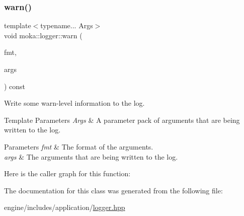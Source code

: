 \subsubsection{\texorpdfstring{warn()}{warn()}}
{\footnotesize\ttfamily template$<$typename... Args$>$ \\
void moka\+::logger\+::warn (\begin{DoxyParamCaption}\item[{const char $\ast$}]{fmt,  }\item[{Args \&\&...}]{args }\end{DoxyParamCaption}) const}



Write some warn-\/level information to the log. 


\begin{DoxyTemplParams}{Template Parameters}
{\em Args} & A parameter pack of arguments that are being written to the log. \\
\hline
\end{DoxyTemplParams}

\begin{DoxyParams}{Parameters}
{\em fmt} & The format of the arguments. \\
\hline
{\em args} & The arguments that are being written to the log. \\
\hline
\end{DoxyParams}
Here is the caller graph for this function\+:


The documentation for this class was generated from the following file\+:\begin{DoxyCompactItemize}
\item 
engine/includes/application/\mbox{\hyperlink{logger_8hpp}{logger.\+hpp}}\end{DoxyCompactItemize}
